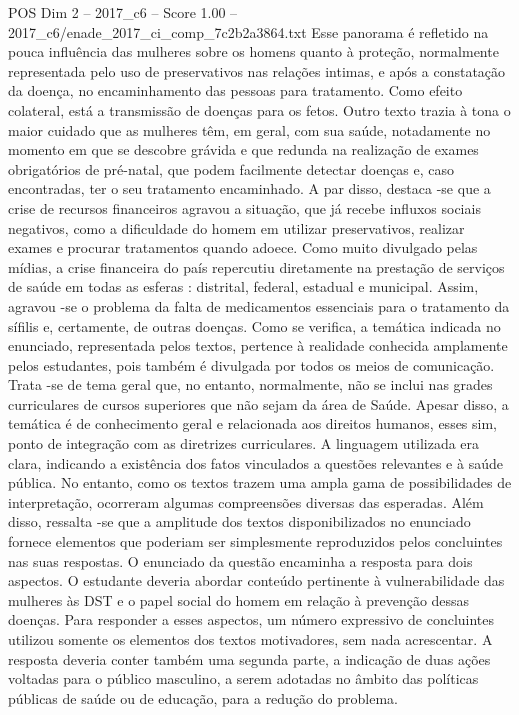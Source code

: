 \begin{textsample}{POS Dim 2 – 2017\_c6 – Score 1.00 – 2017\_c6/enade\_2017\_ci\_comp\_7c2b2a3864.txt}
Esse panorama é refletido na pouca influência das mulheres sobre os homens quanto à proteção, normalmente representada pelo uso de preservativos nas relações intimas, e após a constatação da doença, no encaminhamento das pessoas para tratamento.
Como efeito colateral, está a transmissão de doenças para os fetos.
Outro texto trazia à tona o maior cuidado que as mulheres têm, em geral, com sua saúde, notadamente no momento em que se descobre grávida e que redunda na realização de exames obrigatórios de pré-natal, que podem facilmente detectar doenças e, caso encontradas, ter o seu tratamento encaminhado.
A par disso, destaca -se que a crise de recursos financeiros agravou a situação, que já recebe influxos sociais negativos, como a dificuldade do homem em utilizar preservativos, realizar exames e procurar tratamentos quando adoece.
Como muito divulgado pelas mídias, a crise financeira do país repercutiu diretamente na prestação de serviços de saúde em todas as esferas : distrital, federal, estadual e municipal.
Assim, agravou -se o problema da falta de medicamentos essenciais para o tratamento da sífilis e, certamente, de outras doenças.
Como se verifica, a temática indicada no enunciado, representada pelos textos, pertence à realidade conhecida amplamente pelos estudantes, pois também é divulgada por todos os meios de comunicação.
Trata -se de tema geral que, no entanto, normalmente, não se inclui nas grades curriculares de cursos superiores que não sejam da área de Saúde.
Apesar disso, a temática é de conhecimento geral e relacionada aos direitos humanos, esses sim, ponto de integração com as diretrizes curriculares.
A linguagem utilizada era clara, indicando a existência dos fatos vinculados a questões relevantes e à saúde pública.
No entanto, como os textos trazem uma ampla gama de possibilidades de interpretação, ocorreram algumas compreensões diversas das esperadas.
Além disso, ressalta -se que a amplitude dos textos disponibilizados no enunciado fornece elementos que poderiam ser simplesmente reproduzidos pelos concluintes nas suas respostas.
O enunciado da questão encaminha a resposta para dois aspectos.
O estudante deveria abordar conteúdo pertinente à vulnerabilidade das mulheres às DST e o papel social do homem em relação à prevenção dessas doenças.
Para responder a esses aspectos, um número expressivo de concluintes utilizou somente os elementos dos textos motivadores, sem nada acrescentar.
A resposta deveria conter também uma segunda parte, a indicação de duas ações voltadas para o público masculino, a serem adotadas no âmbito das políticas públicas de saúde ou de educação, para a redução do problema.

\end{textsample}
